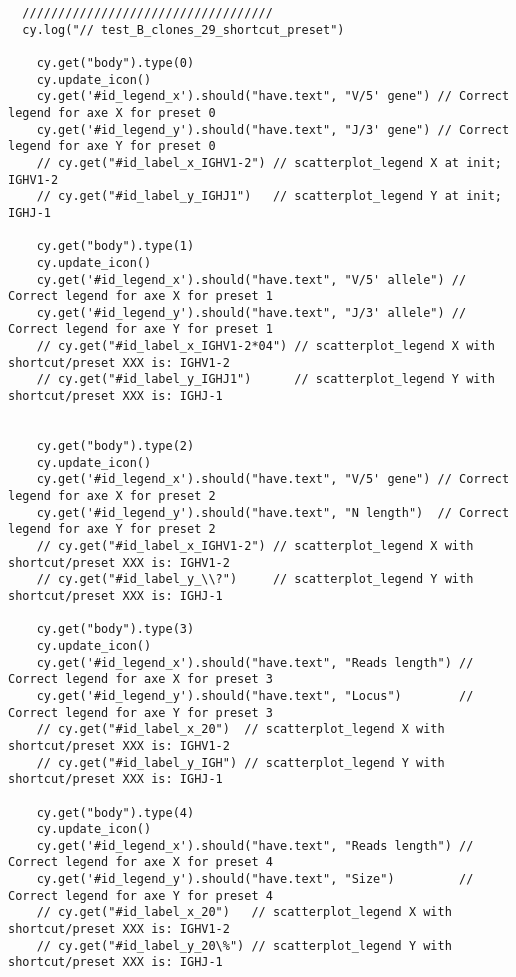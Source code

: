 \begin{verbatim}
  ///////////////////////////////////
  cy.log("// test_B_clones_29_shortcut_preset")

    cy.get("body").type(0)
    cy.update_icon()
    cy.get('#id_legend_x').should("have.text", "V/5' gene") // Correct legend for axe X for preset 0
    cy.get('#id_legend_y').should("have.text", "J/3' gene") // Correct legend for axe Y for preset 0
    // cy.get("#id_label_x_IGHV1-2") // scatterplot_legend X at init; IGHV1-2
    // cy.get("#id_label_y_IGHJ1")   // scatterplot_legend Y at init; IGHJ-1

    cy.get("body").type(1)
    cy.update_icon()
    cy.get('#id_legend_x').should("have.text", "V/5' allele") // Correct legend for axe X for preset 1
    cy.get('#id_legend_y').should("have.text", "J/3' allele") // Correct legend for axe Y for preset 1
    // cy.get("#id_label_x_IGHV1-2*04") // scatterplot_legend X with shortcut/preset XXX is: IGHV1-2
    // cy.get("#id_label_y_IGHJ1")      // scatterplot_legend Y with shortcut/preset XXX is: IGHJ-1


    cy.get("body").type(2)
    cy.update_icon()
    cy.get('#id_legend_x').should("have.text", "V/5' gene") // Correct legend for axe X for preset 2
    cy.get('#id_legend_y').should("have.text", "N length")  // Correct legend for axe Y for preset 2
    // cy.get("#id_label_x_IGHV1-2") // scatterplot_legend X with shortcut/preset XXX is: IGHV1-2
    // cy.get("#id_label_y_\\?")     // scatterplot_legend Y with shortcut/preset XXX is: IGHJ-1

    cy.get("body").type(3)
    cy.update_icon()
    cy.get('#id_legend_x').should("have.text", "Reads length") // Correct legend for axe X for preset 3
    cy.get('#id_legend_y').should("have.text", "Locus")        // Correct legend for axe Y for preset 3
    // cy.get("#id_label_x_20")  // scatterplot_legend X with shortcut/preset XXX is: IGHV1-2
    // cy.get("#id_label_y_IGH") // scatterplot_legend Y with shortcut/preset XXX is: IGHJ-1

    cy.get("body").type(4)
    cy.update_icon()
    cy.get('#id_legend_x').should("have.text", "Reads length") // Correct legend for axe X for preset 4
    cy.get('#id_legend_y').should("have.text", "Size")         // Correct legend for axe Y for preset 4
    // cy.get("#id_label_x_20")   // scatterplot_legend X with shortcut/preset XXX is: IGHV1-2
    // cy.get("#id_label_y_20\%") // scatterplot_legend Y with shortcut/preset XXX is: IGHJ-1


\end{verbatim}
